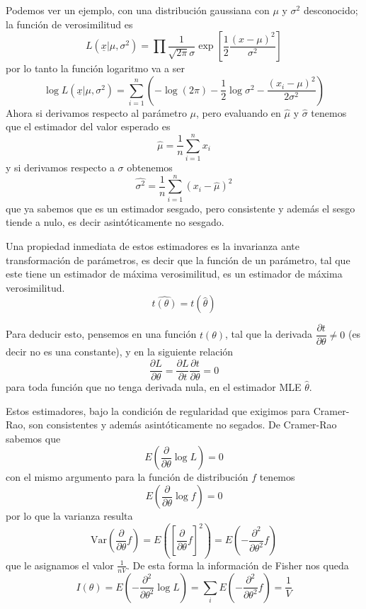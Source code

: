 \documentclass{article}
\numberwithin{equation}{section} %
\begin{document}
Podemos ver un ejemplo, con una distribución gaussiana con $\mu$ y $\sigma^2$ desconocido; la función de verosimilitud es
\begin{equation}
L(\underline{x}|\mu, \sigma^2) = \prod \frac{1}{\sqrt{2\pi}\sigma} \exp\left[\frac{1}{2} \frac{(x - \mu)^2}{\sigma^2}\right]
\end{equation}
por lo tanto la función logaritmo va a ser
\begin{equation}
\log L(\underline{x}|\mu, \sigma^2) = \sum_{i = 1}^{n} \left( -\log(2\pi) - \frac{1}{2} \log \sigma^2 - \frac{(x_i - \mu)^2}{2\sigma^2}\right) 
\end{equation}
Ahora si derivamos respecto al parámetro $\mu$, pero evaluando en $\hat{\mu}$ y $\hat{\sigma}$ tenemos que el estimador del valor esperado es
\begin{equation}
\hat{\mu} = \frac{1}{n} \sum_{i = 1}^{n} x_i
\end{equation}
y si derivamos respecto a $\sigma$ obtenemos
\begin{equation}
\hat{\sigma^2} = \frac{1}{n} \sum_{i = 1}^{n} (x_i - \hat{\mu})^2
\end{equation}
que ya sabemos que es un estimador sesgado, pero consistente y además el sesgo tiende a nulo, es decir asintóticamente no sesgado.

Una propiedad inmediata de estos estimadores es la invarianza ante transformación de parámetros, es decir que la función de un parámetro, tal que este tiene un estimador de máxima verosimilitud, es un estimador de máxima verosimilitud.
\begin{equation}
\hat{t(\theta)} = t(\hat{\theta})
\end{equation}


Para deducir esto, pensemos en una función $t(\theta)$, tal que la derivada $\dfrac{\partial t}{\partial \theta} \neq 0$ (es decir no es una constante), y en la siguiente relación
\[ \frac{\partial L}{\partial \theta} = \frac{\partial L}{\partial t} \frac{\partial t}{\partial \theta} = 0 \]
para toda función que no tenga derivada nula, en el estimador MLE $\hat{\theta}$.

Estos estimadores, bajo la condición de regularidad que exigimos para Cramer-Rao, son consistentes y además asintóticamente no segados. De Cramer-Rao sabemos que
\[ E\left(\frac{\partial}{\partial \theta} \log L \right) = 0 \]
con el mismo argumento para la función de distribución $f$ tenemos
\[ E\left(\frac{\partial}{\partial \theta} \log f \right) = 0 \]
por lo que la varianza resulta
\[ \text{Var}\left( \frac{\partial}{\partial \theta} f \right) = E\left(\left[\frac{\partial}{\partial \theta} f\right]^2\right) =  E\left(- \frac{\partial^2}{\partial \theta^2} f\right) \]
que le asignamos el valor $\frac{1}{n V}$. De esta forma la información de Fisher nos queda
\[ I(\theta) = E\left(- \frac{\partial^2}{\partial \theta^2} \log L \right) = \sum_i E\left(- \frac{\partial^2}{\partial \theta^2} f\right) = \frac{1}{V}\]
\end{document}
